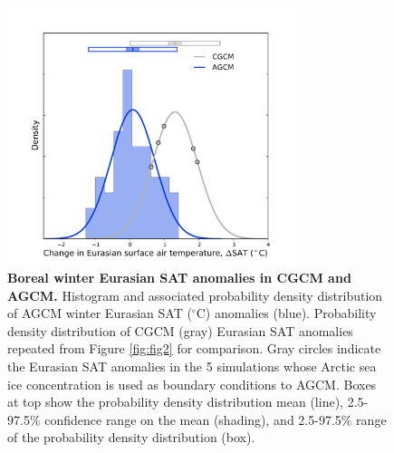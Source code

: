 \documentclass{nature}
\begin{document}
\begin{figure}%
\centering
\noindent\includegraphics[width=20pc]{Word/Figure_3.pdf}
\caption{\textbf{Boreal winter Eurasian SAT anomalies in CGCM and AGCM.} Histogram and associated probability density distribution of AGCM winter Eurasian SAT ($^\circ$C) anomalies (blue). Probability density distribution of CGCM (gray) Eurasian SAT anomalies repeated from Figure \ref{fig:fig2} for comparison. Gray circles indicate the Eurasian SAT anomalies in the 5 simulations whose Arctic sea ice concentration is used as boundary conditions to AGCM. Boxes at top show the probability density distribution mean (line), 2.5-97.5\% confidence range on the mean (shading), and 2.5-97.5\% range of the probability density distribution (box).
} %
\label{fig:fig3} 
\end{figure}
\end{document}
